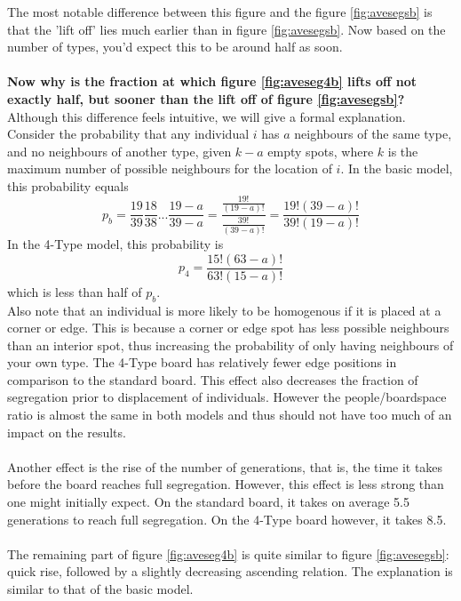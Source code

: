 The most notable difference between this figure and the figure \ref{fig:avesegsb} is that the 'lift off' lies much earlier than in figure \ref{fig:avesegsb}. Now based on the number of types, you'd expect this to be around half as soon.\\\\
\textbf{Now why is the fraction at which figure \ref{fig:aveseg4b} lifts off not exactly half, but sooner than the lift off of figure \ref{fig:avesegsb}?}
Although this difference feels intuitive, we will give a formal explanation. Consider the probability that any individual $i$ has $a$ neighbours of the same type, and no neighbours of another type, given $k-a$ empty spots, where $k$ is the maximum number of possible neighbours for the location of $i$. In the basic model, this probability equals
\[
p_b = \frac{19}{39}\frac{18}{38}...\frac{19-a}{39-a} = \frac{\frac{19!}{(19-a)!}}{\frac{39!}{(39-a)!}} = \frac{19!(39-a)!}{39!(19-a)!}
\]
In the 4-Type model, this probability is
\[
p_4 = \frac{15!(63-a)!}{63!(15-a)!}
\]
which is less than half of $p_b$.\\
Also note that an individual is more likely to be homogenous if it is placed at a corner or edge. This is because a corner or edge spot has less possible neighbours than an interior spot, thus increasing the probability of only having neighbours of your own type. The 4-Type board has relatively fewer edge positions in comparison to the standard board. This effect also decreases the fraction of segregation prior to displacement of individuals.
However the people/boardspace ratio is almost the same in both models and thus should not have too much of an impact on the results.\\
\\
Another effect is the rise of the number of generations, that is, the time it takes before the board reaches full segregation. However, this effect is less strong than one might initially expect. On the standard board, it takes on average 5.5 generations to reach full segregation. On the 4-Type board however, it takes 8.5.\\
\\
The remaining part of figure \ref{fig:aveseg4b} is quite similar to figure \ref{fig:avesegsb}: quick rise, followed by a slightly decreasing ascending relation. The explanation is similar to that of the basic model.
